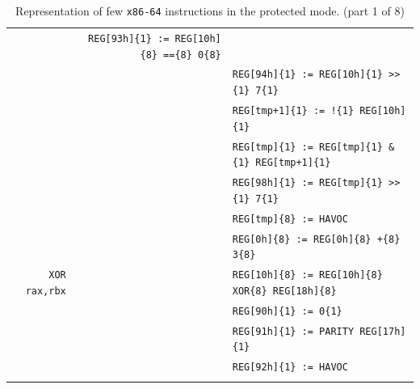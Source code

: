 \documentclass[10pt,twocolumn]{article}
\begin{document}
\begin{table}[!h]
\begin{center}
\begin{tabular}{r|rl}
& \texttt{REG[93h]\{1\} := REG[10h]\{8\} ==\{8\} 0\{8\}} \\ & %
& \texttt{REG[94h]\{1\} := REG[10h]\{1\} >>\{1\} 7\{1\}} \\ & %

& \texttt{REG[tmp+1]\{1\} := !\{1\} REG[10h]\{1\}} \\ & %
& \texttt{REG[tmp]\{1\} := REG[tmp]\{1\} \&\{1\} REG[tmp+1]\{1\}} \\ & %
& \texttt{REG[98h]\{1\} := REG[tmp]\{1\} >>\{1\} 7\{1\}} \\ & %

& \texttt{REG[tmp]\{8\} := HAVOC} \\ &
& \texttt{REG[0h]\{8\} := REG[0h]\{8\} +\{8\} 3\{8\}} \\ \hline

\texttt{XOR rax,rbx} & %
& \texttt{REG[10h]\{8\} := REG[10h]\{8\} XOR\{8\} REG[18h]\{8\}} \\ & %

& \texttt{REG[90h]\{1\} := 0\{1\}} \\ & %
& \texttt{REG[91h]\{1\} := PARITY REG[17h]\{1\}} \\ & %
& \texttt{REG[92h]\{1\} := HAVOC} \\ & %


\end{tabular}
\end{center}
\caption{Representation of few \texttt{x86-64} instructions in the
protected mode. (part 1 of 8)}
\label{tab:recogniser:x86_64_examples:begin}
\end{table}

\clearpage
\end{document}
